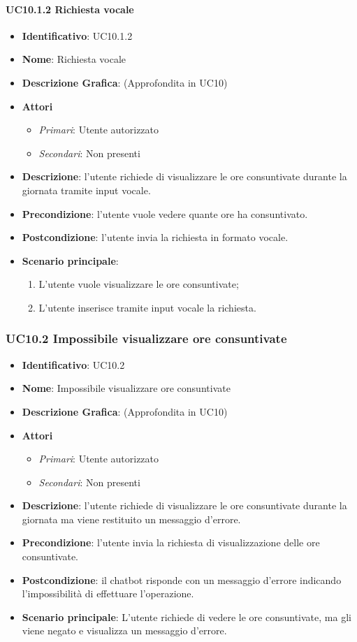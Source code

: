 \paragraph{UC10.1.2 Richiesta vocale}
\begin{itemize}
	\item \textbf{Identificativo}: UC10.1.2
	\item \textbf{Nome}: Richiesta vocale
	\item \textbf{Descrizione Grafica}: (Approfondita in UC10)
	\item \textbf{Attori}
	\begin{itemize}
		\item \textit{Primari}: Utente autorizzato
		\item \textit{Secondari}: Non presenti
	\end{itemize}
	\item \textbf{Descrizione}: l'utente richiede di visualizzare le ore consuntivate durante la giornata tramite input vocale.
	\item \textbf{Precondizione}: l'utente vuole vedere quante ore ha consuntivato.
	\item \textbf{Postcondizione}: l'utente invia la richiesta in formato vocale.
	\item \textbf{Scenario principale}: 
	\begin{enumerate}
		\item L'utente vuole visualizzare le ore consuntivate;
		\item L'utente inserisce tramite input vocale la richiesta.
	\end{enumerate}
\end{itemize}

\subsubsection{UC10.2 Impossibile visualizzare ore consuntivate}
\begin{itemize}
	\item \textbf{Identificativo}: UC10.2
	\item \textbf{Nome}: Impossibile visualizzare ore consuntivate
	\item \textbf{Descrizione Grafica}: (Approfondita in UC10)
	\item \textbf{Attori}
	\begin{itemize}
		\item \textit{Primari}: Utente autorizzato
		\item \textit{Secondari}: Non presenti
	\end{itemize}
	\item \textbf{Descrizione}: l'utente richiede di visualizzare le ore consuntivate durante la giornata ma viene restituito un messaggio d'errore.
	\item \textbf{Precondizione}: l'utente invia la richiesta di visualizzazione delle ore consuntivate.
	\item \textbf{Postcondizione}: il chatbot risponde con un messaggio d'errore indicando l'impossibilità di effettuare l'operazione.
	\item \textbf{Scenario principale}: L'utente richiede di vedere le ore consuntivate, ma gli viene negato e visualizza un messaggio d'errore.
\end{itemize}
\newpage